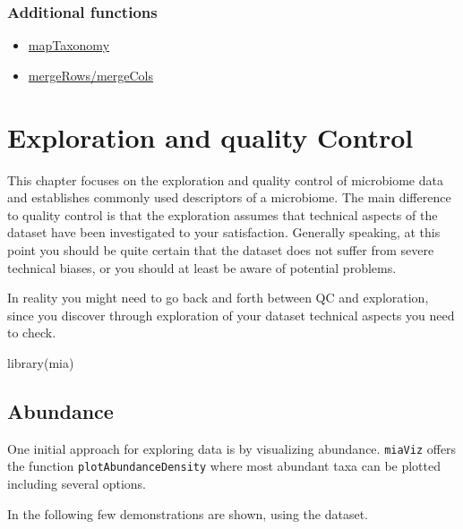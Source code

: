 \documentclass[
]{book}
\newenvironment{Shaded}{\begin{snugshade}}{\end{snugshade}}
\newcommand{\FunctionTok}[1]{\textcolor[rgb]{0.00,0.00,0.00}{#1}}
\newcommand{\NormalTok}[1]{#1}
\providecommand{\tightlist}{%
  \setlength{\itemsep}{0pt}\setlength{\parskip}{0pt}}
\begin{document}
\hypertarget{additional-functions}{%
\subsection{Additional functions}\label{additional-functions}}

\begin{itemize}
\tightlist
\item
  \href{https://microbiome.github.io/mia/reference/taxonomy-methods.html}{mapTaxonomy}
\item
  \href{https://microbiome.github.io/mia/reference/merge-methods.html}{mergeRows/mergeCols}
\end{itemize}

\hypertarget{quality-control}{%
\chapter{Exploration and quality Control}\label{quality-control}}

This chapter focuses on the exploration and quality control of
microbiome data and establishes commonly used descriptors of a
microbiome. The main difference to quality control is that the
exploration assumes that technical aspects of the dataset have been
investigated to your satisfaction. Generally speaking, at this point
you should be quite certain that the dataset does not suffer from
severe technical biases, or you should at least be aware of potential
problems.

In reality you might need to go back and forth between QC and exploration,
since you discover through exploration of your dataset technical aspects you
need to check.

\begin{Shaded}
\begin{Highlighting}[]
\FunctionTok{library}\NormalTok{(mia)}
\end{Highlighting}
\end{Shaded}

\hypertarget{abundance}{%
\section{Abundance}\label{abundance}}

One initial approach for exploring data is by visualizing abundance. \texttt{miaViz} offers
the function \texttt{plotAbundanceDensity} where most abundant taxa can be plotted
including several options.

In the following few demonstrations are shown, using the
\citep{Lahti2014} dataset.
\end{document}
